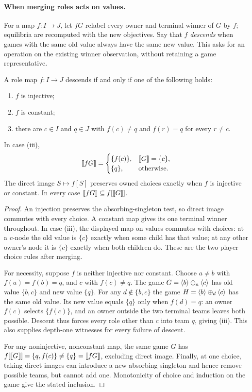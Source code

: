 \paragraph{When merging roles acts on values.}
For a map $f:I\to J$, let $fG$ relabel every owner and terminal winner
of $G$ by $f$; equilibria are recomputed with the new objectives.
Say that $f$ \emph{descends} when games with the same old value always
have the same new value. This asks for an operation on the existing
winner observation, without retaining a game representative.

\begin{theorem}
\label{olv:thm:coalition-maps}
A role map $f:I\to J$ descends if and only if one of the following holds:
\begin{enumerate}[label=(\roman*)]
\item $f$ is injective;
\item $f$ is constant;
\item there are $c\in I$ and $q\in J$ with $f(c)\ne q$ and
$f(r)=q$ for every $r\ne c$.
\end{enumerate}
In case (iii),
\[
 \llbracket fG\rrbracket=
 \begin{cases}
  \{f(c)\},&\llbracket G\rrbracket=\{c\},\\
  \{q\},&\text{otherwise}.
 \end{cases}
\]
The direct image $S\mapsto f[S]$ preserves owned choices exactly
when $f$ is injective or constant. In every case
$\llbracket fG\rrbracket\subseteq f[\llbracket G\rrbracket]$.
\end{theorem}
\begin{proof}
An injection preserves the absorbing-singleton test, so direct image
commutes with every choice. A constant map gives its one terminal winner
throughout. In case (iii), the displayed map on values commutes with
choices: at a $c$-node the old value is $\{c\}$ exactly when some child
has that value; at any other owner's node it is $\{c\}$ exactly when
both children do. These are the two-player choice rules after merging.

For necessity, suppose $f$ is neither injective nor constant. Choose
$a\ne b$ with $f(a)=f(b)=q$, and $c$ with $f(c)\ne q$.
The game $G=\langle b\rangle\mathbin{\oplus_{a}}\langle c\rangle$ has old value $\{b,c\}$ and new
value $\{q\}$. For any $d\notin\{b,c\}$ the game
$H=\langle b\rangle\mathbin{\oplus_{d}}\langle c\rangle$ has the same old value. Its new value equals
$\{q\}$ only when $f(d)=q$: an owner $f(c)$ selects $\{f(c)\}$,
and an owner outside the two terminal teams leaves both possible.
Descent thus forces every role other than $c$ into team $q$, giving (iii).
This also supplies depth-one witnesses for every failure of descent.

For any noninjective, nonconstant map, the same game $G$ has
$f[\llbracket G\rrbracket]=\{q,f(c)\}\ne\{q\}=\llbracket fG\rrbracket$, excluding direct image.
Finally, at one choice, taking direct images can introduce a new
absorbing singleton and hence remove possible teams, but cannot add one.
Monotonicity of choice and induction on the game give the stated inclusion.
\end{proof}

